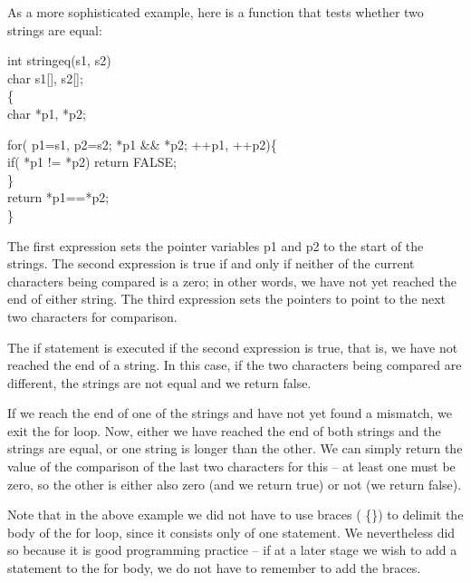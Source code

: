 As a  more sophisticated  example, here  is
a function that tests whether two strings are equal:
\begin{code}
int stringeq(s1, s2) \\
\> char s1[], s2[]; \\
\{ \+\\
  char *p1, *p2; \addVspace

  for( p1=s1, p2=s2; *p1 \&\& *p2; ++p1, ++p2)\{ \\
  \>   if( *p1 != *p2) return FALSE; \\
  \} \\
  return *p1==*p2; 
  \-\\
\} 
\end{code}
\noindent
    The first expression sets the pointer variables {\cd p1} and {\cd
p2} to the start of the strings.  The second  expression is  true if 
and only  if neither  of the current characters  being compared is a
zero; in other words,  we have not yet reached  the end  of
either string. The third expression sets the pointers to point to the
next two characters for comparison.

     The {\cd if}  statement is  executed if the second expression is
true, that is, we have  not reached  the end of a string. In this
case, if the two characters being compared are different, the strings
are not equal and we return false.

     If we  reach the  end of  one of  the strings  and have  not yet 
found a mismatch, we  exit the  {\cd for} loop.  Now, either we have
reached the end of both strings and  the strings are equal, or one
string is longer than the other. We can simply  return the  value of
the comparison of the last two characters for this --  at least  one
must  be zero,  so the other is either also zero (and we return true)
or not (we return false).

Note that in the above example we did not have to use braces ({\cd
\{\}}) to delimit the body  of the {\cd for} loop, since it consists
only of one statement.  We nevertheless did so because it is good
programming practice -- if at a later stage we wish to add a
statement to the {\cd for} body, we do not have to remember to add
the braces.



